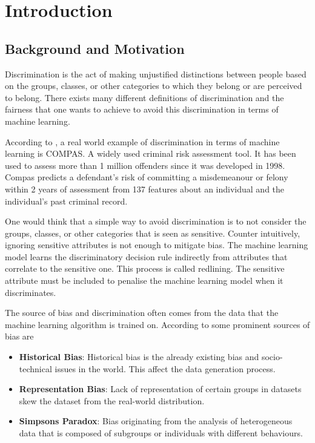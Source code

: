 
\chapter{Introduction}
\label{ch:intro}


\section{Background and Motivation}
\label{sec:intro:background}
Discrimination is the act of making unjustified distinctions between people based on the groups, classes, or other categories to which they belong or are perceived to belong. There exists many different definitions of discrimination \cite{altman2011discrimination} and the fairness that one wants to achieve to avoid this discrimination in terms of machine learning. \cite{pmlr-v81-binns18a}

According to \citet{dressel2018}, a real world example of discrimination in terms of machine learning is COMPAS. A widely used criminal risk assessment tool. It has been used to assess more than 1 million offenders since it was developed in 1998. Compas predicts a defendant’s risk of committing a misdemeanour or felony within 2 years of assessment from 137 features about an individual and the individual’s past criminal record.

One would think that a simple way to avoid discrimination is to not consider the groups, classes, or other categories that is seen as sensitive. Counter intuitively, ignoring sensitive attributes is not enough to mitigate bias. The machine learning model learns the discriminatory decision rule indirectly from attributes that correlate to the sensitive one. \cite{dressel2018, calders2010three} This process is called redlining. The sensitive attribute must be included to penalise the machine learning model when it discriminates.

The source of bias and discrimination often comes from the data that the machine learning algorithm is trained on. According to \citet{mehrabi2021survey} some prominent sources of bias are

\begin{itemize}
    \item \textbf{Historical Bias}: Historical bias is the already existing bias and socio-technical issues in the world. This affect the data generation process.
    \item \textbf{Representation Bias}: Lack of representation of certain groups in datasets skew the dataset from the real-world distribution.
    \item \textbf{Simpsons Paradox}: Bias originating from the analysis of heterogeneous data that is composed of subgroups or individuals with different behaviours.
\end{itemize}

